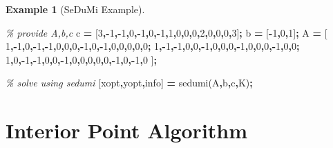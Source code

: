 \documentclass[
]{book}
\newenvironment{Shaded}{\begin{snugshade}}{\end{snugshade}}
\newcommand{\CommentTok}[1]{\textcolor[rgb]{0.56,0.35,0.01}{\textit{#1}}}
\newcommand{\FloatTok}[1]{\textcolor[rgb]{0.00,0.00,0.81}{#1}}
\newcommand{\NormalTok}[1]{#1}
\newcommand{\OperatorTok}[1]{\textcolor[rgb]{0.81,0.36,0.00}{\textbf{#1}}}
\newcommand{\VariableTok}[1]{\textcolor[rgb]{0.00,0.00,0.00}{#1}}
\theoremstyle{definition}
\theoremstyle{definition}
\newtheorem{example}{Example}[chapter]
\theoremstyle{definition}
\theoremstyle{definition}
\theoremstyle{remark}
\begin{document}
\begin{example}[SeDuMi Example]
\begin{Shaded}
\begin{Highlighting}[]
\CommentTok{\% provide A,b,c}
\VariableTok{c} \OperatorTok{=}\NormalTok{ [}\FloatTok{3}\OperatorTok{,{-}}\FloatTok{1}\OperatorTok{,{-}}\FloatTok{1}\OperatorTok{,}\FloatTok{0}\OperatorTok{,{-}}\FloatTok{1}\OperatorTok{,}\FloatTok{0}\OperatorTok{,{-}}\FloatTok{1}\OperatorTok{,}\FloatTok{1}\OperatorTok{,}\FloatTok{0}\OperatorTok{,}\FloatTok{0}\OperatorTok{,}\FloatTok{0}\OperatorTok{,}\FloatTok{2}\OperatorTok{,}\FloatTok{0}\OperatorTok{,}\FloatTok{0}\OperatorTok{,}\FloatTok{0}\OperatorTok{,}\FloatTok{3}\NormalTok{]}\OperatorTok{;}
\VariableTok{b} \OperatorTok{=}\NormalTok{ [}\OperatorTok{{-}}\FloatTok{1}\OperatorTok{,}\FloatTok{0}\OperatorTok{,}\FloatTok{1}\NormalTok{]}\OperatorTok{;}
\VariableTok{A} \OperatorTok{=}\NormalTok{ [}
    \FloatTok{1}\OperatorTok{,{-}}\FloatTok{1}\OperatorTok{,}\FloatTok{0}\OperatorTok{,{-}}\FloatTok{1}\OperatorTok{,{-}}\FloatTok{1}\OperatorTok{,}\FloatTok{0}\OperatorTok{,}\FloatTok{0}\OperatorTok{,}\FloatTok{0}\OperatorTok{,{-}}\FloatTok{1}\OperatorTok{,}\FloatTok{0}\OperatorTok{,{-}}\FloatTok{1}\OperatorTok{,}\FloatTok{0}\OperatorTok{,}\FloatTok{0}\OperatorTok{,}\FloatTok{0}\OperatorTok{,}\FloatTok{0}\OperatorTok{,}\FloatTok{0}\OperatorTok{;}
    \FloatTok{1}\OperatorTok{,{-}}\FloatTok{1}\OperatorTok{,{-}}\FloatTok{1}\OperatorTok{,}\FloatTok{0}\OperatorTok{,}\FloatTok{0}\OperatorTok{,{-}}\FloatTok{1}\OperatorTok{,}\FloatTok{0}\OperatorTok{,}\FloatTok{0}\OperatorTok{,}\FloatTok{0}\OperatorTok{,{-}}\FloatTok{1}\OperatorTok{,}\FloatTok{0}\OperatorTok{,}\FloatTok{0}\OperatorTok{,}\FloatTok{0}\OperatorTok{,{-}}\FloatTok{1}\OperatorTok{,}\FloatTok{0}\OperatorTok{,}\FloatTok{0}\OperatorTok{;}
    \FloatTok{1}\OperatorTok{,}\FloatTok{0}\OperatorTok{,{-}}\FloatTok{1}\OperatorTok{,{-}}\FloatTok{1}\OperatorTok{,}\FloatTok{0}\OperatorTok{,}\FloatTok{0}\OperatorTok{,{-}}\FloatTok{1}\OperatorTok{,}\FloatTok{0}\OperatorTok{,}\FloatTok{0}\OperatorTok{,}\FloatTok{0}\OperatorTok{,}\FloatTok{0}\OperatorTok{,}\FloatTok{0}\OperatorTok{,{-}}\FloatTok{1}\OperatorTok{,}\FloatTok{0}\OperatorTok{,{-}}\FloatTok{1}\OperatorTok{,}\FloatTok{0}
\NormalTok{    ]}\OperatorTok{;}

\CommentTok{\% solve using sedumi}
\NormalTok{[}\VariableTok{xopt}\OperatorTok{,}\VariableTok{yopt}\OperatorTok{,}\VariableTok{info}\NormalTok{] }\OperatorTok{=} \VariableTok{sedumi}\NormalTok{(}\VariableTok{A}\OperatorTok{,}\VariableTok{b}\OperatorTok{,}\VariableTok{c}\OperatorTok{,}\VariableTok{K}\NormalTok{)}\OperatorTok{;}
\end{Highlighting}
\end{Shaded}

\end{example}

\hypertarget{interior-point-algorithm}{%
\section{Interior Point Algorithm}\label{interior-point-algorithm}}

  
\end{document}
